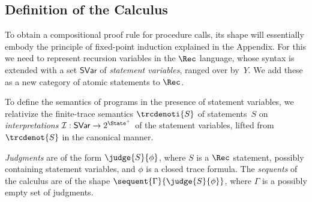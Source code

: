 \documentclass[a4paper,numberwithinsect]{lipics-v2021}
\newcommand{\dg}[1]{\marginpar{DG: #1}}
\begin{document}



\subsection{Definition of the Calculus}
\label{sec:proof-calculus-rec}

To obtain a compositional proof rule for procedure calls, its shape
will essentially embody the principle of fixed-point induction
explained in the Appendix. %
%
For this we need to represent recursion variables in the $\Rec$
language, whose syntax is extended with a set $\mathsf{SVar}$ of
\emph{statement variables}, ranged over by~$Y$. We add these as a new
category of atomic statements to $\Rec$.


To define the semantics of programs in the presence of statement
variables, we relativize the finite-trace semantics $\trcdenoti{S}$ of
statements~$S$ on \emph{interpretations}
$\mathcal{I} : \mathsf{SVar} \rightarrow 2^{\State^+}$ of the
statement variables, lifted from $\trcdenot{S}$ in the canonical
manner.


\begin{definition}
  \label{def:calculus-syntax}
  \emph{Judgments} are of the form $\judge{S}{\phi}$, where $S$ is a
  $\Rec$ statement, possibly containing statement variables, and
  $\phi$ is a closed trace formula.
  The \emph{sequents} of the calculus are of the shape
  $\sequent{\Gamma}{\judge{S}{\phi}}$, where $\Gamma$ is a possibly
  empty set of judgments.
\end{definition}

\end{document}
